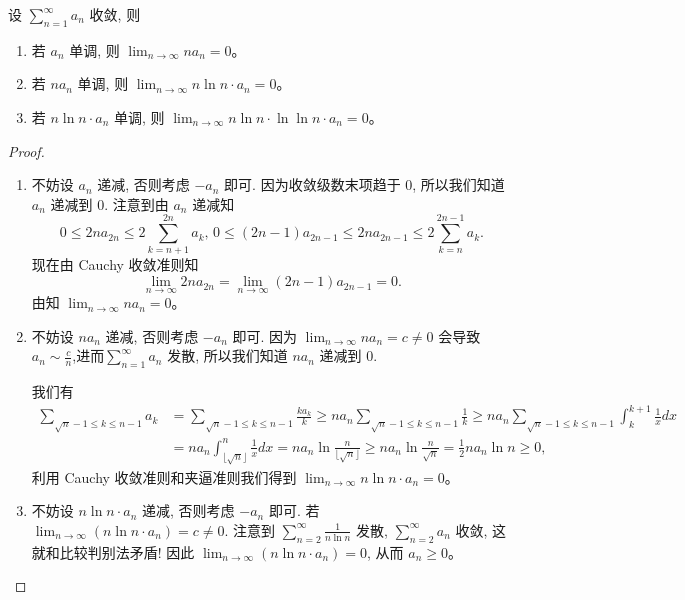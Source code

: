 \documentclass[../../main.tex]{subfiles}
\begin{document}
\begin{proposition}\label{proposition:单调收敛级数的阶}
设 \( \sum_{n = 1}^{\infty} a_n \) 收敛, 则
\begin{enumerate}
\item 若 \( a_n \) 单调, 则 \( \lim_{n \to \infty} n a_n = 0 \)。

\item 若 \( n a_n \) 单调, 则 \( \lim_{n \to \infty} n \ln n \cdot a_n = 0 \)。

\item 若 \( n \ln n \cdot a_n \) 单调, 则 \( \lim_{n \to \infty} n \ln n \cdot \ln \ln n \cdot a_n = 0 \)。
\end{enumerate}
\end{proposition}
\begin{proof}
\begin{enumerate}
\item 不妨设 \( a_n \) 递减, 否则考虑 \( -a_n \) 即可. 因为收敛级数末项趋于 0, 所以我们知道 \( a_n \) 递减到 0. 注意到由 \( a_n \) 递减知
\[
0 \leqslant 2n a_{2n} \leqslant 2 \sum_{k = n + 1}^{2n} a_k, \, 0 \leqslant (2n - 1) a_{2n - 1} \leqslant 2n a_{2n - 1} \leqslant 2 \sum_{k = n}^{2n - 1} a_k.
\]
现在由 Cauchy 收敛准则知
\[
\lim_{n \to \infty} 2n a_{2n} = \lim_{n \to \infty} (2n - 1) a_{2n - 1} = 0.
\]
由知 \( \lim_{n \to \infty} n a_n = 0 \)。

\item 不妨设 \( n a_n \) 递减, 否则考虑 \( -a_n \) 即可. 因为 \( \lim_{n \to \infty} n a_n = c \neq 0 \) 会导致$a_n\sim \frac{c}{n}$,进而\( \sum_{n = 1}^{\infty} a_n \) 发散, 所以我们知道 \( n a_n \) 递减到 0.

我们有
\begin{align*}
\sum_{\sqrt{n} - 1 \leqslant k \leqslant n - 1} a_k &= \sum_{\sqrt{n} - 1 \leqslant k \leqslant n - 1} \frac{k a_k}{k} \geqslant n a_n \sum_{\sqrt{n} - 1 \leqslant k \leqslant n - 1} \frac{1}{k} \geqslant n a_n \sum_{\sqrt{n} - 1 \leqslant k \leqslant n - 1} \int_{k}^{k + 1} \frac{1}{x} dx \\
&= n a_n \int_{\lfloor \sqrt{n} \rfloor}^{n} \frac{1}{x} dx = n a_n \ln \frac{n}{\lfloor \sqrt{n} \rfloor} \geqslant n a_n \ln \frac{n}{\sqrt{n}} = \frac{1}{2} n a_n \ln n \geqslant 0,
\end{align*}
利用 Cauchy 收敛准则和夹逼准则我们得到 \( \lim_{n \to \infty} n \ln n \cdot a_n = 0 \)。

\item 不妨设 \( n \ln n \cdot a_n \) 递减, 否则考虑 \( -a_n \) 即可. 若 \( \lim_{n \to \infty} (n \ln n \cdot a_n) = c \neq 0 \). 注意到 \( \sum_{n = 2}^{\infty} \frac{1}{n \ln n} \) 发散, \( \sum_{n = 2}^{\infty} a_n \) 收敛, 这就和比较判别法矛盾! 因此 \( \lim_{n \to \infty} (n \ln n \cdot a_n) = 0 \), 从而 \( a_n \geqslant 0 \)。


\end{enumerate}
\end{proof}
\end{document}
